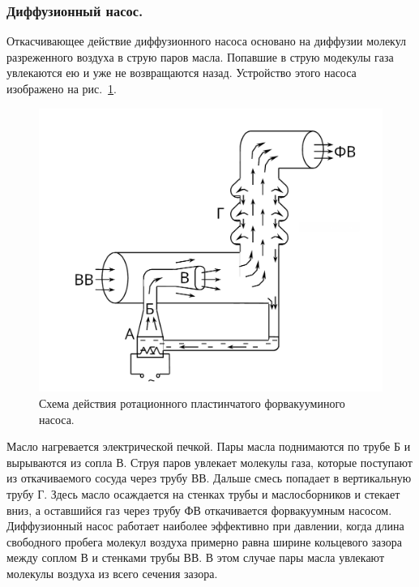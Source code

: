 \documentclass[a4paper,11pt]{article}
\begin{document}
\subsubsection{Диффузионный насос.}
Откасчивающее действие диффузионного насоса основано на диффузии молекул разреженного воздуха в струю паров масла. Попавшие в струю модекулы газа увлекаются ею и уже не возвращаются назад. Устройство этого насоса изображено на рис.~\ref{fig:img3}.\\
\begin{center}
\begin{figure}
  \includegraphics[scale = 0.4]{scheme3.png}
  \caption{Схема действия ротационного пластинчатого форвакууминого насоса.}
  \label{fig:img3}
\end{figure}
\end{center}
Масло нагревается электрической печкой. Пары масла поднимаются по трубе Б и вырываются из сопла В. Струя паров увлекает молекулы газа, которые поступают из откачиваемого сосуда через трубу ВВ. Дальше смесь попадает в вертикальную трубу Г. Здесь масло осаждается на стенках трубы и маслосборников и стекает вниз, а оставшийся газ через трубу ФВ откачивается форвакуумным насосом. Диффузионный насос работает наиболее эффективно при давлении, когда длина свободного пробега молекул воздуха примерно равна ширине кольцевого зазора между соплом В и стенками трубы ВВ. В этом случае пары масла увлекают молекулы воздуха из всего сечения зазора.
\end{document}
